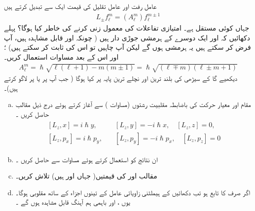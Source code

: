 عامل رفت اور عامل تقلیل  کی قیمت ایک  سے تبدیل کرتے ہیں 
\begin{align}\label{مساوات_تین_ابعاد_عامل_تقلیل_رفعت_اکائی_تبدیلی}
L_{\pm} f_{\ell}^m = (A_{\ell}^m) f_{\ell}^{m \pm 1}
\end{align}
جہاں  کوئی مستقل ہے۔  امتیازی تفاعلات کی معمول زنی کرنے  کی خاطر  کیا ہوگا؟   پہلے دکھائیں کہ  اور  ایک دوسرے کے ہرمشی جوڑی دار ہیں ( چونکہ  اور  قابل مشاہدہ  ہیں،  آپ فرض کر سکتے ہیں یہ ہرمشی ہوں گے لیکن آپ چاہیں تو اس کی ثابت کر سکتے ہیں) ؛ اور   اس کے بعد مساوات    استعمال کریں۔  
\begin{align}\label{مساوات_تین_ابعادی_اے_ایل_ایم}
A_{\ell}^m = \hslash \sqrt{\ell (\ell +1) - m (m \pm 1)} = \hslash \sqrt{(\ell \mp m)(\ell \pm m + 1)} 
\end{align}
دیکھیے گا کے سیڑھی کی بلند ترین اور نچلے ترین پایہ پر کیا ہوگا ( جب آپ  پر  یا  پر  لاگو کرتے ہیں)۔ 
\begin{enumerate}[a.]
\item
مقام اور معیار حرکت کی باضابطہ  مقلبیت رشتوں    (مساوات  )   سے آغاز  کرتے ہوئے درج ذیل مقالب  حاصل کریں ۔
\begin{gather}
\begin{aligned}\label{مساوات_تین_ابعادی_مقلبی_رشتے}
[L_z , x] = i \hslash y, & \quad [L_z , y] = - i \hslash x, \quad  [L_z , z] = 0, \\
 [L_z , p_x] = i \hslash p_y ,   &\quad [L_z , p_y] = - i \hslash p_x , \quad [L_z , p_z] = 0
\end{aligned}
\end{gather}
\item
ان نتائج کو استعمال کرتے ہوئے مساوات    سے   حاصل کریں ۔
\item
مقالب   اور  کی قیمتیں( جہاں  اور  ہیں)  تلاش کریں۔
\item
اگر  صرف  کا تابع ہو تب دکھائیں کے ہیملٹنی  زاویائی عامل   کے  تینوں اجزاء کے ساتھ مقلوبی  ہوگا۔ یوں ،   اور  باہمی ہم آہنگ  قابل مشاہدہ  ہوں گے ۔
\end{enumerate}
